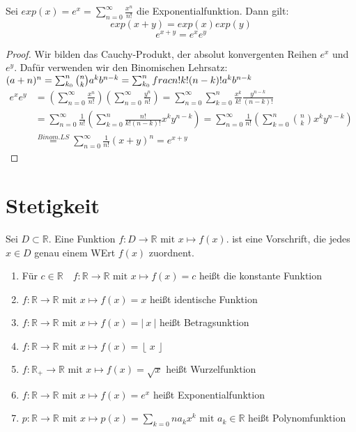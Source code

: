 \documentclass[a4paper,titlepage,oneside]{article}
\def\R{\ensuremath{\mathbb{R}} }
\def\e{\ensuremath{\mathit{e}} }
\newcommand{\suminf}[2][n]{\ensuremath{\sum_{#1= 0}^{\infty}{#2}}}
\newcommand{\abs}[1]{\ensuremath{\left|\:#1\:\right|}}
\newcommand{\floor}[1]{\ensuremath{\left\lfloor\:#1\:\right\rfloor}}
\theoremstyle{thmstyle}
\begin{document}
\begin{subkorr}
Sei $exp(x) = \e^x = \suminf{\frac{x^n}{n!}}$ die Exponentialfunktion. Dann gilt:
\[exp(x+y) = exp(x) exp(y)\]
\[e^{x+y} = e^x e^y\]
\begin{proof}
Wir bilden das Cauchy-Produkt, der absolut konvergenten Reihen $e^x$ und $ e^y$. Dafür verwenden wir den Binomischen Lehrsatz: $(a+n)^n = \sum_{k_0}^{n}{\binom{n}{k}a^kb^{n-k}} = \sum_{k_0}^{n}{\\frac{n!}{k!(n-k)!}a^kb^{n-k}}$\\
\begin{math} \displaystyle
\begin{aligned}
e^x e^y &= \left(\suminf{\frac{x^n}{n!}}\right)\left(\suminf{\frac{y^n}{n!}}\right) = \suminf{\sum_{k = 0}^{n}{\frac{x^k}{k!}\frac{y^{n-k}}{(n-k)!}}} \\
&= \suminf{\frac{1}{n!}\left(\sum_{k = 0}^{n}{\frac{n!}{k!(n-k)!}x^ky^{n-k}}\right)} = \suminf{\frac{1}{n!}\left(\sum_{k = 0}^{n}{\binom{n}{k}x^ky^{n-k}}\right)}\\
& \overset{Binom.LS}{=} \suminf{\frac{1}{n!}(x+y)^n} = e^{x+y}
\end{aligned}
\end{math}
\end{proof}
\end{subkorr}


\newpage
\section{Stetigkeit}
\begin{defi}
Sei $ D \subset \R$. Eine Funktion $f : D \to \R \text{ mit } x \mapsto f(x) $. ist eine Vorschrift, die jedes $ x \in D$ genau einem WErt $f(x)$ zuordnent.
\end{defi}

\begin{bsp}
\begin{enumerate}
\item Für $ c \in \R \quad f : \R \to \R \text{ mit } x \mapsto f(x) = c $ heißt die konstante Funktion %
\item $f : \R \to \R \text{ mit } x \mapsto f(x) = x $ heißt identische Funktion %
\item $f : \R \to \R \text{ mit } x \mapsto f(x) = \abs{x} $ heißt Betragsunktion %
\item $f : \R \to \R \text{ mit } x \mapsto f(x) = \floor{x} $ %
\item $f : \R_+ \to \R \text{ mit } x \mapsto f(x) = \sqrt{x} $ heißt Wurzelfunktion %
\item $f : \R \to \R \text{ mit } x \mapsto f(x) = e^x $ heißt Exponentialfunktion %
\item $p : \R \to \R \text{ mit } x \mapsto p(x) = \sum_{k=0}{n}{a_kx^k} \text{ mit } a_k \in \R $ heißt Polynomfunktion %
\end{enumerate}
\end{bsp}
\end{document}
